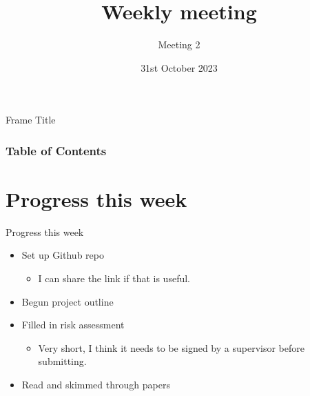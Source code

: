 \documentclass{beamer}
\title{Weekly meeting}
\subtitle{Meeting 2}
\date{31st October 2023}
\begin{document}
\frame{\titlepage}

\begin{frame}{Frame Title}
\frametitle{Table of Contents}
\tableofcontents
\end{frame}


\section{Progress this week}
\begin{frame}{Progress this week}
    \begin{itemize}
        \item Set up Github repo
            \begin{itemize}
                \item I can share the link if that is useful.
            \end{itemize}
        \item Begun project outline
        \item Filled in risk assessment
            \begin{itemize}
                \item Very short, I think it needs to be signed by a supervisor before submitting. 
            \end{itemize}
        \item Read and skimmed through papers
    \end{itemize}
\end{frame}
\end{document}

